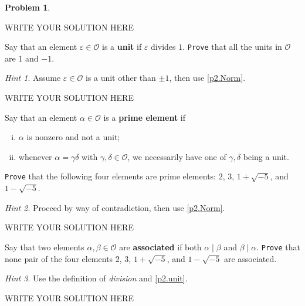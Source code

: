 \documentclass[11pt]{article}
\theoremstyle{plain}
\theoremstyle{definition}
\newtheorem{problem}{Problem}
\theoremstyle{remark}
\newtheorem*{hint}{Hint}
\numberwithin{equation}{problem}
\begin{document}
\begin{problem}
\begin{listinprob}
\begin{solution}
WRITE YOUR SOLUTION HERE
\end{solution}\clearpage %
		\item\label{p2.unit} Say that an element $\varepsilon\in\mathscr{O}$ is a \textbf{unit} if $\varepsilon$ divides $1$. 
		\texttt{Prove} that all the units in $\mathscr{O}$ are $1$ and $-1$.
		\begin{hint}
			Assume $\varepsilon\in\mathscr{O}$ is a unit other than $\pm 1$, then use \cref{p2.Norm}.
		\end{hint}
\begin{solution} %
WRITE YOUR SOLUTION HERE
\end{solution}\clearpage %
		\item Say that an element $\alpha\in\mathscr{O}$ is a \textbf{prime element} if 
		\begin{enumerate}[(i)]
			\item $\alpha$ is nonzero and not a unit;
			\item whenever $\alpha=\gamma\delta$ with $\gamma, \delta \in \mathscr{O}$, we necessarily have one of $\gamma, \delta$ being a unit.
		\end{enumerate}
		\texttt{Prove} that the following four elements are prime elements: $2$, $3$, $1+\sqrt{-5}$, and $1-\sqrt{-5}$.
		\begin{hint}
			Proceed by way of contradiction, then use \cref{p2.Norm}.
		\end{hint}
\begin{solution} %
WRITE YOUR SOLUTION HERE
\end{solution}\clearpage %
		\item Say that two elements $\alpha,\beta\in\mathscr{O}$ are \textbf{associated} if both $\alpha\mid\beta$ and $\beta\mid\alpha$. 
		\texttt{Prove} that none pair of the four elements $2$, $3$, $1+\sqrt{-5}$, and $1-\sqrt{-5}$ are associated. 
		\begin{hint}
			Use the definition of \emph{division} and \cref{p2.unit}.
		\end{hint}
\begin{solution} %
WRITE YOUR SOLUTION HERE
\end{solution}\clearpage %

\end{listinprob}
\end{problem}
\end{document}
